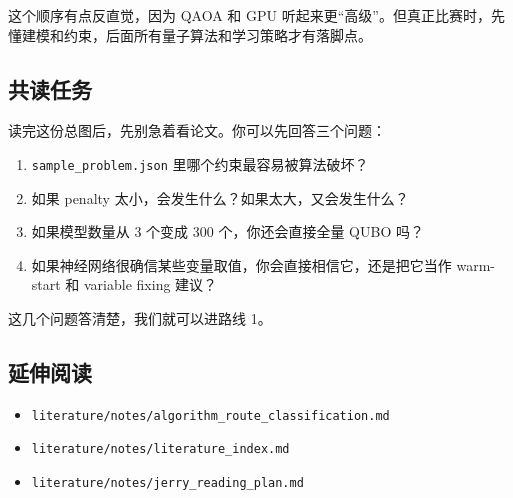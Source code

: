 \documentclass[UTF8,12pt,a4paper]{ctexart}
\begin{document}
这个顺序有点反直觉，因为 QAOA 和 GPU 听起来更“高级”。但真正比赛时，先懂建模和约束，后面所有量子算法和学习策略才有落脚点。

\subsection*{共读任务}

读完这份总图后，先别急着看论文。你可以先回答三个问题：

\begin{enumerate}
\item \texttt{sample\_problem.json} 里哪个约束最容易被算法破坏？
\item 如果 penalty 太小，会发生什么？如果太大，又会发生什么？
\item 如果模型数量从 3 个变成 300 个，你还会直接全量 QUBO 吗？
\item 如果神经网络很确信某些变量取值，你会直接相信它，还是把它当作 warm-start 和 variable fixing 建议？
\end{enumerate}

这几个问题答清楚，我们就可以进路线 1。

\subsection*{延伸阅读}

\begin{itemize}
\item \texttt{literature/notes/algorithm\_route\_classification.md}
\item \texttt{literature/notes/literature\_index.md}
\item \texttt{literature/notes/jerry\_reading\_plan.md}
\end{itemize}
\end{document}
